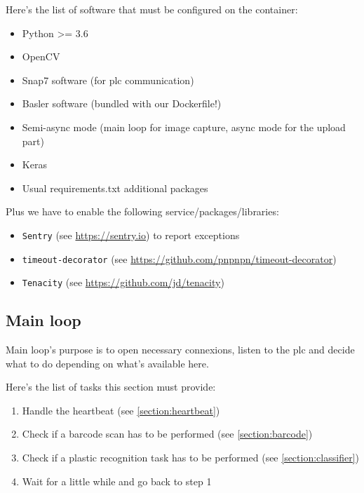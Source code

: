 
Here's the list of software that must be configured on the container:

\begin{itemize}
    \item Python >= 3.6
    \item OpenCV
    \item Snap7 software (for \gls{plc} communication)
    \item Basler software (bundled with our Dockerfile!)
    \item Semi-async mode (main loop for image capture, async mode for the upload part)
    \item Keras
    \item Usual requirements.txt additional packages
\end{itemize}

Plus we have to enable the following service/packages/libraries:

\begin{itemize}
    \item \texttt{Sentry} (see \url{https://sentry.io}) to report exceptions
    \item \texttt{timeout-decorator} (see \url{https://github.com/pnpnpn/timeout-decorator})
    \item \texttt{Tenacity} (see \url{https://github.com/jd/tenacity})
\end{itemize}


\subsection{Main loop}

Main loop's purpose is to open necessary connexions, listen to the \gls{plc} and decide what to do depending on what's available here.

Here's the list of tasks this section must provide:

\begin{enumerate}
    \item Handle the \gls{heartbeat} (see \ref{section:heartbeat})
    \item Check if a barcode scan has to be performed (see \ref{section:barcode})
    \item Check if a plastic recognition task has to be performed (see \ref{section:classifier})
    \item Wait for a little while and go back to step 1
\end{enumerate}




